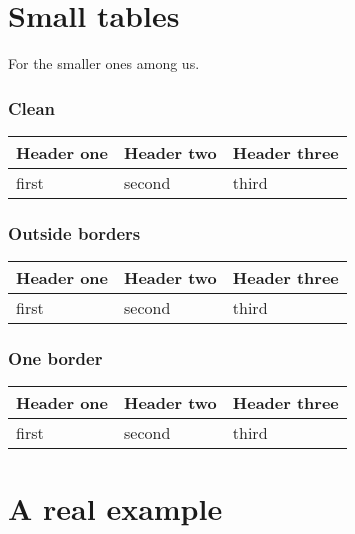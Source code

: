 \documentclass{article}
\begin{document}
\part*{Small tables}

For the smaller ones among us.

\section*{Clean}


\begin{tabular}{ l | l | l }
Header one  &  Header two  &  Header three
\\
\hline

first  &  second  &  third
\\

\end{tabular}

\section*{Outside borders}


\begin{tabular}{ |l | l | l| }
 Header one  &  Header two  &  Header three \\
\hline

 first  &  second  &  third \\

\end{tabular}

\section*{One border}


\begin{tabular}{ |l | l | l }
 Header one  &  Header two  &  Header three
\\
\hline

 first  &  second  &  third
\\

\end{tabular}

\part*{A real example}
\end{document}
